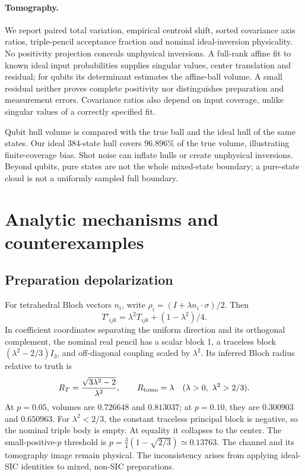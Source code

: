 \documentclass[11pt]{article}
\begin{document}
\paragraph{Tomography.}
We report paired total variation, empirical centroid shift, sorted covariance
axis ratios, triple-pencil acceptance fraction and nominal ideal-inversion
physicality. No positivity projection conceals unphysical inversions.
A full-rank affine fit to known ideal input probabilities supplies singular
values, center translation and residual; for qubits its determinant estimates
the affine-ball volume. A small residual neither proves complete positivity
nor distinguishes preparation and measurement errors. Covariance ratios also
depend on input coverage, unlike singular values of a correctly specified fit.

Qubit hull volume is compared with the true ball and the ideal hull of the same
states. Our ideal 384-state hull covers $96.896\%$ of the true volume, illustrating
finite-coverage bias. Shot noise can inflate hulls or create unphysical inversions.
Beyond qubits, pure states are not the whole mixed-state boundary; a pure-state
cloud is not a uniformly sampled full boundary.

\section{Analytic mechanisms and counterexamples}
\subsection{Preparation depolarization}
For tetrahedral Bloch vectors $n_i$, write
$\rho_i=(I+\lambda n_i\cdot\sigma)/2$. Then
\begin{equation}
T'_{ijk}=\lambda^2T_{ijk}+(1-\lambda^2)/4.
\end{equation}
In coefficient coordinates separating the uniform direction and its orthogonal
complement, the nominal real pencil has a scalar block 1, a traceless block
$(\lambda^2-2/3)I_3$, and off-diagonal coupling scaled by $\lambda^2$.
Its inferred Bloch radius relative to truth is
\begin{equation}
R_T=\frac{\sqrt{3\lambda^2-2}}{\lambda^2},\qquad
R_{\rm tomo}=\lambda\quad (\lambda>0,\ \lambda^2>2/3).
\end{equation}
At $p=0.05$, volumes are $0.726648$ and $0.813037$; at $p=0.10$, they are
$0.300903$ and $0.650963$. For $\lambda^2<2/3$, the constant traceless principal
block is negative, so the nominal triple body is empty. At equality it collapses
to the center. The small-positive-$p$ threshold is
$p=\tfrac34(1-\sqrt{2/3})\simeq0.13763$.
The channel and its tomography image remain physical. The inconsistency arises
from applying ideal-SIC identities to mixed, non-SIC preparations.
\end{document}
